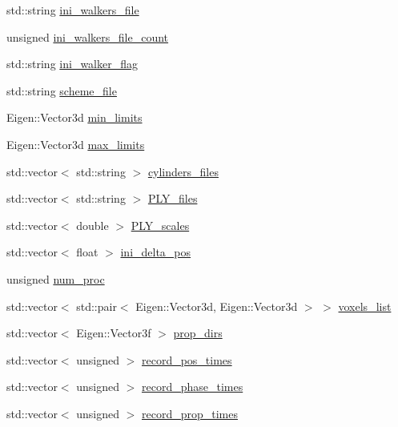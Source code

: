 \begin{DoxyCompactItemize}
\item 
std\+::string \hyperlink{class_parameters_a84db69d29321fccb7cc7ea724a74df50}{ini\+\_\+walkers\+\_\+file}
\item 
unsigned \hyperlink{class_parameters_ae01ac4f7d6d3b9eea6799f5c929ddf00}{ini\+\_\+walkers\+\_\+file\+\_\+count}
\item 
std\+::string \hyperlink{class_parameters_a87cb2db5b45bf9cb36e74903fecfaa6e}{ini\+\_\+walker\+\_\+flag}
\item 
std\+::string \hyperlink{class_parameters_afbb7caab773abb16753263a0b04c8a2c}{scheme\+\_\+file}
\item 
Eigen\+::\+Vector3d \hyperlink{class_parameters_aa9d387477810c2bb574b83ecd1fbf8f0}{min\+\_\+limits}
\item 
Eigen\+::\+Vector3d \hyperlink{class_parameters_a879b4c717e0f59c9bbc4b7810b8fdde3}{max\+\_\+limits}
\item 
std\+::vector$<$ std\+::string $>$ \hyperlink{class_parameters_abdef3b0fe62c5fdca7d417d01edd7422}{cylinders\+\_\+files}
\item 
std\+::vector$<$ std\+::string $>$ \hyperlink{class_parameters_a76984fe140c1c6c8a047dd622561200d}{P\+L\+Y\+\_\+files}
\item 
std\+::vector$<$ double $>$ \hyperlink{class_parameters_a97ed7a4d1b6c6ea8f6507a6a0fc04698}{P\+L\+Y\+\_\+scales}
\item 
std\+::vector$<$ float $>$ \hyperlink{class_parameters_aea1568fbc8a92bd90303ea8afc9e8c63}{ini\+\_\+delta\+\_\+pos}
\item 
unsigned \hyperlink{class_parameters_aab0de21efc3f85e5c44205ed5ebf9d4d}{num\+\_\+proc}
\item 
std\+::vector$<$ std\+::pair$<$ Eigen\+::\+Vector3d, Eigen\+::\+Vector3d $>$ $>$ \hyperlink{class_parameters_aefbd07d8501ebb9311bbb1ea7c37be26}{voxels\+\_\+list}
\item 
std\+::vector$<$ Eigen\+::\+Vector3f $>$ \hyperlink{class_parameters_a4bbfed0148cec6e10d0e90d85437a37a}{prop\+\_\+dirs}
\item 
std\+::vector$<$ unsigned $>$ \hyperlink{class_parameters_a4f884a7effd3a8816c78084ff3c2b202}{record\+\_\+pos\+\_\+times}
\item 
std\+::vector$<$ unsigned $>$ \hyperlink{class_parameters_a559e66b65a2cb4391d1099bf0db6ec44}{record\+\_\+phase\+\_\+times}
\item 
std\+::vector$<$ unsigned $>$ \hyperlink{class_parameters_af47bd2eada81c6c581aaa8c70d04c8d6}{record\+\_\+prop\+\_\+times}
\item 

\end{DoxyCompactItemize}
